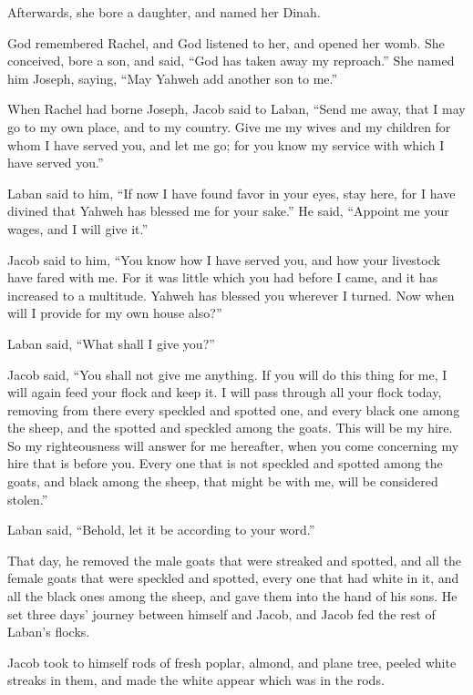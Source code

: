 {Afterwards, she bore a daughter, and named her Dinah.
\par }{\PP {}God remembered Rachel, and God listened to her, and opened her womb.
She conceived, bore a son, and said, “God has taken away my reproach.”
She named him Joseph, saying, “May Yahweh add another son to me.”
\par }{\PP {}When Rachel had borne Joseph, Jacob said to Laban, “Send me away, that I may go to my own place, and to my country.
Give me my wives and my children for whom I have served you, and let me go; for you know my service with which I have served you.”
\par }{\PP {}Laban said to him, “If now I have found favor in your eyes, stay here, for I have divined that Yahweh has blessed me for your sake.”
He said, “Appoint me your wages, and I will give it.”
\par }{\PP {}Jacob said to him, “You know how I have served you, and how your livestock have fared with me.
For it was little which you had before I came, and it has increased to a multitude. Yahweh has blessed you wherever I turned. Now when will I provide for my own house also?”
\par }{\PP {}Laban said, “What shall I give you?”
\par }{\PP Jacob said, “You shall not give me anything. If you will do this thing for me, I will again feed your flock and keep it.
I will pass through all your flock today, removing from there every speckled and spotted one, and every black one among the sheep, and the spotted and speckled among the goats. This will be my hire.
So my righteousness will answer for me hereafter, when you come concerning my hire that is before you. Every one that is not speckled and spotted among the goats, and black among the sheep, that might be with me, will be considered stolen.”
\par }{\PP {}Laban said, “Behold, let it be according to your word.”
\par }{\PP {}That day, he removed the male goats that were streaked and spotted, and all the female goats that were speckled and spotted, every one that had white in it, and all the black ones among the sheep, and gave them into the hand of his sons.
He set three days’ journey between himself and Jacob, and Jacob fed the rest of Laban’s flocks.
\par }{\PP {}Jacob took to himself rods of fresh poplar, almond, and plane tree, peeled white streaks in them, and made the white appear which was in the rods.
}
